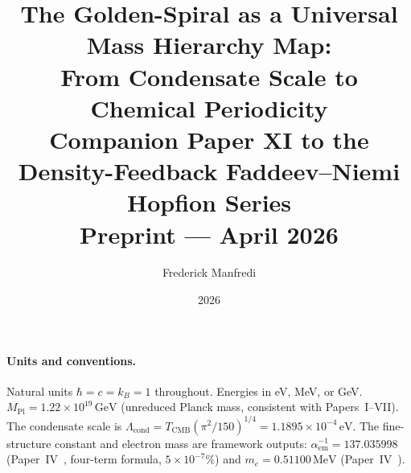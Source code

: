 \documentclass[11pt,a4paper]{article}
\title{\textbf{The Golden-Spiral as a Universal Mass Hierarchy Map:\\
  From Condensate Scale to Chemical Periodicity}
\\[0.6em]
{\large Companion Paper XI to the Density-Feedback
Faddeev--Niemi Hopfion Series}
\\[0.6em]
\large Preprint --- April 2026}
\author{Frederick Manfredi}
\date{2026}
\theoremstyle{definition}
\theoremstyle{remark}
\newcommand{\TCMB}{T_{\mathrm{CMB}}}
\newcommand{\Lcond}{\Lambda_{\mathrm{cond}}}
\newcommand{\MPl}{M_{\mathrm{Pl}}}
\newcommand{\aem}{\alpha_{\mathrm{em}}}
\begin{document}
\maketitle

\paragraph*{Units and conventions.}
Natural units $\hbar = c = k_B = 1$ throughout.
Energies in eV, MeV, or GeV.
$\MPl = 1.22\times10^{19}\,\mathrm{GeV}$ (unreduced Planck mass,
consistent with Papers~I--VII).
The condensate scale is
$\Lcond = \TCMB(\pi^2/150)^{1/4} = 1.1895\times10^{-4}\,\mathrm{eV}$.
The fine-structure constant and electron mass are framework outputs:
$\aem^{-1} = 137.035998$ (Paper~IV~\cite{Paper4}, four-term formula, $5\times10^{-7}\%$) and
$m_e = 0.51100\,\mathrm{MeV}$ (Paper~IV~\cite{Paper4}).
\end{document}
